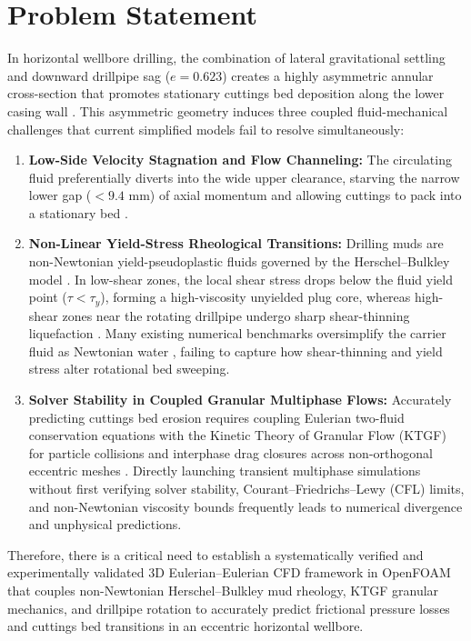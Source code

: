 \section{Problem Statement}
In horizontal wellbore drilling, the combination of lateral gravitational settling and downward drillpipe sag ($e = 0.623$) creates a highly asymmetric annular cross-section that promotes stationary cuttings bed deposition along the lower casing wall \citep{Osgouei2010, Shehab2015}. This asymmetric geometry induces three coupled fluid-mechanical challenges that current simplified models fail to resolve simultaneously:
\begin{enumerate}
    \item \textbf{Low-Side Velocity Stagnation and Flow Channeling:} The circulating fluid preferentially diverts into the wide upper clearance, starving the narrow lower gap ($< 9.4\text{ mm}$) of axial momentum and allowing cuttings to pack into a stationary bed \citep{Shehab2015, Khaled2020}.
    \item \textbf{Non-Linear Yield-Stress Rheological Transitions:} Drilling muds are non-Newtonian yield-pseudoplastic fluids governed by the Herschel--Bulkley model \citep{Hajipour2020, Kelessidis2006}. In low-shear zones, the local shear stress drops below the fluid yield point ($\tau < \tau_y$), forming a high-viscosity unyielded plug core, whereas high-shear zones near the rotating drillpipe undergo sharp shear-thinning liquefaction \citep{Kelessidis2006}. Many existing numerical benchmarks oversimplify the carrier fluid as Newtonian water \citep{Shehab2015}, failing to capture how shear-thinning and yield stress alter rotational bed sweeping.
    \item \textbf{Solver Stability in Coupled Granular Multiphase Flows:} Accurately predicting cuttings bed erosion requires coupling Eulerian two-fluid conservation equations with the Kinetic Theory of Granular Flow (KTGF) for particle collisions and interphase drag closures across non-orthogonal eccentric meshes \citep{Hajipour2020, Li2026}. Directly launching transient multiphase simulations without first verifying solver stability, Courant--Friedrichs--Lewy (CFL) limits, and non-Newtonian viscosity bounds frequently leads to numerical divergence and unphysical predictions.
\end{enumerate}

Therefore, there is a critical need to establish a systematically verified and experimentally validated 3D Eulerian--Eulerian CFD framework in OpenFOAM that couples non-Newtonian Herschel--Bulkley mud rheology, KTGF granular mechanics, and drillpipe rotation to accurately predict frictional pressure losses and cuttings bed transitions in an eccentric horizontal wellbore.


